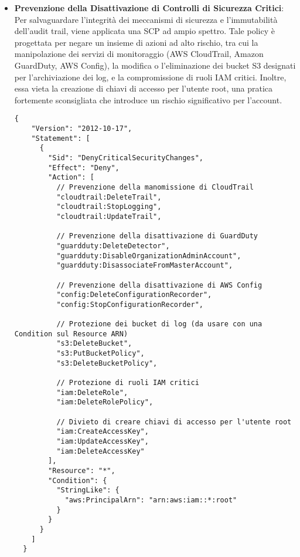 \begin{itemize}
  \item \textbf{Prevenzione della Disattivazione di Controlli di Sicurezza Critici}: Per salvaguardare l'integrità dei meccanismi di sicurezza e l'immutabilità dell'audit trail, viene applicata una SCP ad ampio spettro. Tale policy è progettata per negare un insieme di azioni ad alto rischio, tra cui la manipolazione dei servizi di monitoraggio (AWS CloudTrail, Amazon GuardDuty, AWS Config), la modifica o l'eliminazione dei bucket S3 designati per l'archiviazione dei log, e la compromissione di ruoli IAM critici. Inoltre, essa vieta la creazione di chiavi di accesso per l'utente root, una pratica fortemente sconsigliata che introduce un rischio significativo per l'account.

  \begin{lstlisting}[style=json, caption={SCP per la protezione dei controlli di sicurezza fondamentali}, label=lst:scp-deny-security-controls]
  {
    "Version": "2012-10-17",
    "Statement": [
      {
        "Sid": "DenyCriticalSecurityChanges",
        "Effect": "Deny",
        "Action": [
          // Prevenzione della manomissione di CloudTrail
          "cloudtrail:DeleteTrail",
          "cloudtrail:StopLogging",
          "cloudtrail:UpdateTrail",
          
          // Prevenzione della disattivazione di GuardDuty
          "guardduty:DeleteDetector",
          "guardduty:DisableOrganizationAdminAccount",
          "guardduty:DisassociateFromMasterAccount",
          
          // Prevenzione della disattivazione di AWS Config
          "config:DeleteConfigurationRecorder",
          "config:StopConfigurationRecorder",
          
          // Protezione dei bucket di log (da usare con una Condition sul Resource ARN)
          "s3:DeleteBucket",
          "s3:PutBucketPolicy",
          "s3:DeleteBucketPolicy",
          
          // Protezione di ruoli IAM critici
          "iam:DeleteRole",
          "iam:DeleteRolePolicy",
          
          // Divieto di creare chiavi di accesso per l'utente root
          "iam:CreateAccessKey",
          "iam:UpdateAccessKey",
          "iam:DeleteAccessKey"
        ],
        "Resource": "*",
        "Condition": {
          "StringLike": {
            "aws:PrincipalArn": "arn:aws:iam::*:root"
          }
        }
      }
    ]
  }
  \end{lstlisting}
    

\end{itemize}
